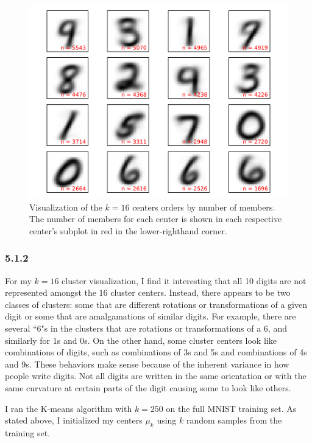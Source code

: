 \documentclass[12pt]{amsart}
\begin{document}
\begin{figure}[H]
	\includegraphics[width=\columnwidth]{k_16_means.pdf}
    \caption{Visualization of the $k = 16$ centers orders by number of members.  The number of members for each center is shown in each respective center's subplot in red in the lower-righthand corner.}
    \label{fig:k_16_means}
\end{figure}

\subsubsection*{5.1.2}

For my $k = 16$ cluster visualization, I find it interesting that all 10 digits are not represented amongst the 16 cluster centers.  Instead, there appears to be two classes of clusters: some that are different rotations or transformations of a given digit or some that are amalgamations of similar digits.  For example, there are several ``6"s in the clusters that are rotations or transformations of a 6, and similarly for 1s and 0s.  On the other hand, some cluster centers look like combinations of digits, such as combinations of 3s and 5s and combinations of 4s and 9s.  These behaviors make sense because of the inherent variance in how people write digits.  Not all digits are written in the same orientation or with the same curvature at certain parts of the digit causing some to look like others.

I ran the K-means algorithm with $k = 250$ on the full MNIST training set.  As stated above, I initialized my centers $\mu_k$ using $k$ random samples from the training set.
\end{document}
